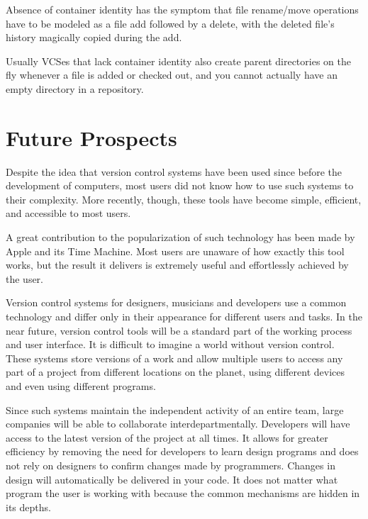 \documentclass[twoside]{article}
\begin{document}
\begin{multicols}{2}
Absence of container identity has the symptom that file rename/move operations have to be modeled as a file add followed by a delete, with the deleted file's history magically copied during the add.

Usually VCSes that lack container identity also create parent directories on the fly whenever a file is added or checked out, and you cannot actually have an empty directory in a repository.


\section{Future Prospects}
Despite the idea that version control systems have been used since before the development of computers, most users did not know how to use such systems to their complexity. More recently, though, these tools have become simple, efficient, and accessible to most users.

A great contribution to the popularization of such technology has been made by Apple and its Time Machine. Most users are unaware of how exactly this tool works, but the result it delivers is extremely useful and effortlessly achieved by the user.

Version control systems for designers, musicians and developers use a common technology and differ only in their appearance for different users and tasks. In the near future, version control tools will be a standard part of the working process and user interface. It is difficult to imagine a world without version control. These systems store versions of a work and allow multiple users to access any part of a project from different locations on the planet, using different devices and even using different programs.

Since such systems maintain the independent activity of an entire team, large companies will be able to collaborate interdepartmentally. Developers will have access to the latest version of the project at all times. It allows for greater efficiency by removing the need for developers to learn design programs and does not rely on designers to confirm changes made by programmers. Changes in design will automatically be delivered in your code. It does not matter what program the user is working with because the common mechanisms are hidden in its depths.




\end{multicols}
\end{document}
